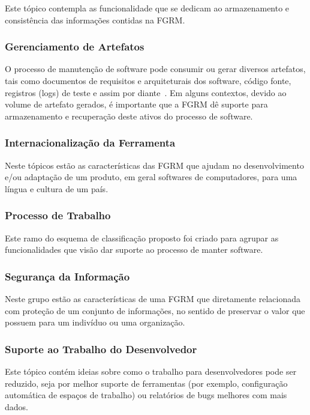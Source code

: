Este tópico contempla as funcionalidade que se dedicam ao armazenamento e
consistência das informações contidas na FGRM\@.

\subsubsection{Gerenciamento de Artefatos}

O processo de manutenção de software pode consumir ou gerar diversos artefatos,
tais como documentos de requisitos e arquiteturais dos software, código fonte,
registros (logs) de teste e assim por diante~\cite{cavalcanti2013bug}. Em alguns
contextos, devido ao volume de artefato gerados, é importante que a FGRM dê
suporte para armazenamento e recuperação deste ativos do processo de software.

\subsubsection{Internacionalização da Ferramenta}

Neste tópicos estão as características das FGRM que ajudam no desenvolvimento
e/ou adaptação de um produto, em geral softwares de computadores, para uma
língua e cultura de um país.

\subsubsection{Processo de Trabalho}
 Este ramo do esquema de classificação proposto foi criado para
 agrupar as funcionalidades que visão dar suporte ao processo de manter
 software.

\subsubsection{Segurança da Informação}

Neste grupo estão as características de uma FGRM que diretamente relacionada com
proteção de um conjunto de informações, no sentido de preservar o valor que
possuem para um indivíduo ou uma organização.

\subsubsection{Suporte ao Trabalho do Desenvolvedor}

Este tópico contém ideias sobre como o trabalho para desenvolvedores pode ser
reduzido, seja por melhor suporte de ferramentas (por exemplo, configuração
automática de espaços de trabalho) ou relatórios de bugs melhores com mais
dados.


